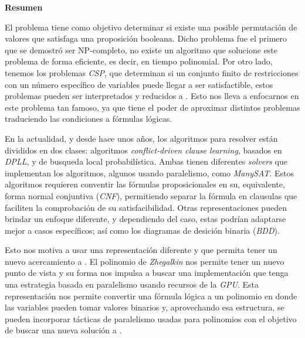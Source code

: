 \cleardoublepage
{}
{}
\thispagestyle{pagebottom}
\noindent\textbf{\Huge Resumen}

\vspace{3.5em}

El problema \sat tiene como objetivo determinar si existe una posible permutación de valores que satisfaga una proposición booleana. Dicho problema fue el primero que se demostró ser NP-completo, no existe un algoritmo que solucione este problema de forma eficiente, es decir, en tiempo polinomial. Por otro lado, tenemos los problemas \textit{CSP}, que determinan si un conjunto finito de restricciones con un número específico de variables puede llegar a ser satisfactible, estos problemas pueden ser interpretados y reducidos a \sat. Esto nos lleva a enfocarnos en este problema tan famoso, ya que tiene el poder de aproximar distintos problemas traduciendo las condiciones a fórmulas lógicas.

En la actualidad, y desde hace unos años, los algoritmos para resolver \sat están divididos en dos clases: algoritmos \textit{conflict-driven clause learning}, basados en \textit{DPLL}, y de busqueda local probabilística. Ambas tienen diferentes \textit{solvers} que implementan los algoritmos, algunos usando paralelismo, como \textit{ManySAT}. Estos algoritmos requieren conventir las fórmulas proposicionales en su, equivalente, forma normal conjuntiva (\textit{CNF}), permitiendo separar la fórmula en clausulas que faciliten la comprobación de su satisfacibilidad. Otras representaciones pueden brindar un enfoque diferente, y dependiendo del caso, estas podrían adaptarse mejor a casos específicos; así como los diagramas de desición binaria (\textit{BDD}).

Esto nos motiva a usar una representación diferente y que permita tener un nuevo acercamiento a \sat. El polinomio de \textit{Zhegalkin} nos permite tener un nuevo punto de vista y su forma nos impulsa a buscar una implementación que tenga una estrategia basada en paralelismo usando recursos de la \textit{GPU}. Esta representación nos permite convertir una fórmula lógica a un polinomio en donde las variables pueden tomar valores binarios y, aprovechando esa estructura, se pueden incorporar tácticas de paralelismo usadas para polinomios con el objetivo de buscar una nueva solución a \sat.

\newpage